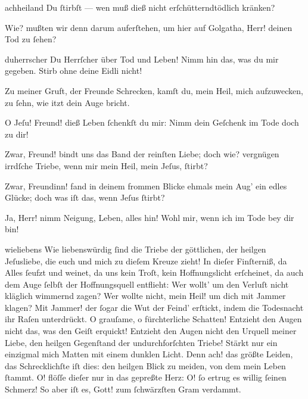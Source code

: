 \documentclass{ees}
\begin{document}
{\begin{movement}{achheiland}
    \voice[Lazarus]
    Du ſtirbſt — wen muß dieß nicht erſchütterndtödlich kränken?

    Wie? mußten wir denn darum auferſtehen,
    um hier auf Golgatha, Herr! deinen Tod zu ſehen?
  \end{movement}

  \begin{movement}{duherrscher}
    \voice[Eidli]
    Du Herrſcher über Tod und Leben!
    Nimm hin das, was du mir gegeben.
    Stirb ohne deine Eidli nicht!

    \voice[Lazarus]
    Zu meiner Gruft, der Freunde Schrecken,
    kamſt du, mein Heil, mich aufzuwecken,
    zu ſehn, wie itzt dein Auge bricht.

    O Jeſu! Freund! dieß Leben ſchenkſt du mir:
    Nimm dein Geſchenk im Tode doch zu dir!

    \voice[Eidli]
    Zwar, Freund! bindt uns das Band der reinſten Liebe;
    doch wie? vergnügen irrdſche Triebe,
    wenn mir mein Heil, mein Jeſus, ſtirbt?

    \voice[Lazarus]
    Zwar, Freundinn! fand in deinem frommen Blicke
    ehmals mein Aug’ ein edles Glücke;
    doch was iſt das, wenn Jeſus ſtirbt?

    Ja, Herr! nimm Neigung, Leben, alles hin!
    Wohl mir, wenn ich im Tode bey dir bin!
  \end{movement}

  \begin{movement}{wieliebens}
    \voice[Johannes]
    Wie liebenswürdig ſind die Triebe
    der göttlichen, der heilgen Jeſusliebe,
    die euch und mich zu dieſem Kreuze zieht!
    In dieſer Finſterniß, da Alles ſeufzt und weinet,
    da uns kein Troſt, kein Hoffnungslicht erſcheinet,
    da auch dem Auge ſelbſt der Hoffnungsquell entflieht:
    Wer wollt’ um den Verluſt nicht kläglich wimmernd zagen?
    Wer wollte nicht, mein Heil! um dich mit Jammer klagen?
    Mit Jammer! der ſogar die Wut der Feind’ erſtickt,
    indem die Todesnacht ihr Raſen unterdrückt.
    O grauſame, o fürchterliche Schatten!
    Entzieht den Augen nicht das, was den Geiſt erquickt!
    Entzieht den Augen nicht den Urquell meiner Liebe,
    den heilgen Gegenſtand der undurchforſchten Triebe!
    Stärkt nur ein einzigmal mich Matten
    mit einem dunklen Licht. Denn ach! das größte Leiden,
    das Schrecklichſte iſt dies: den heilgen Blick zu meiden,
    von dem mein Leben ſtammt.
    O! flöſſe dieſer nur in das gepreßte Herz:
    O! ſo ertrug es willig ſeinen Schmerz!
    So aber iſt es, Gott! zum ſchwärzſten Gram verdammt.
  \end{movement}

}
\end{document}
